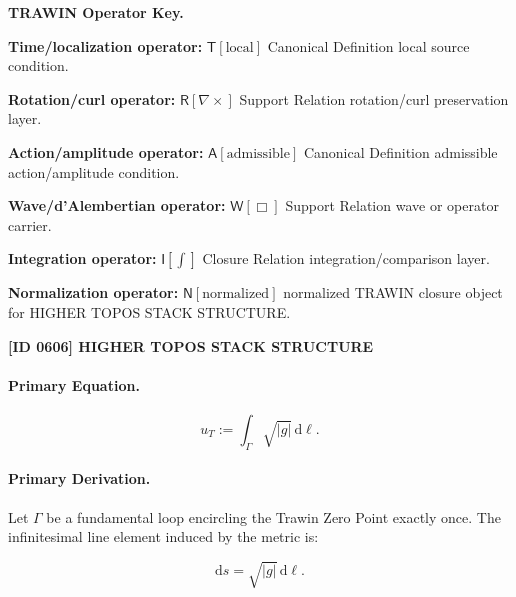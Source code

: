 \par\vspace{0.45\baselineskip}
\noindent\begin{minipage}[t]{\linewidth}
\begingroup
\small
\raggedright
\textbf{TRAWIN Operator Key.}\par
\noindent\textbf{Time/localization operator:} $\mathsf{T}\!\left[\mathrm{local}\right]$ Canonical Definition local source condition.\par
\noindent\textbf{Rotation/curl operator:} $\mathsf{R}\!\left[\nabla\times\right]$ Support Relation rotation/curl preservation layer.\par
\noindent\textbf{Action/amplitude operator:} $\mathsf{A}\!\left[\mathrm{admissible}\right]$ Canonical Definition admissible action/amplitude condition.\par
\noindent\textbf{Wave/d'Alembertian operator:} $\mathsf{W}\!\left[\Box\right]$ Support Relation wave or operator carrier.\par
\noindent\textbf{Integration operator:} $\mathsf{I}\!\left[\int\right]$ Closure Relation integration/comparison layer.\par
\noindent\textbf{Normalization operator:} $\mathsf{N}\!\left[\mathrm{normalized}\right]$ normalized TRAWIN closure object for HIGHER TOPOS STACK STRUCTURE.\par
\endgroup
\end{minipage}

\clearpage
\noindent\textbf{[ID 0606] HIGHER TOPOS STACK STRUCTURE}\par
\vspace{0.35em}
\paragraph{Primary Equation.}
\begin{equation}
u_T := \int_{\Gamma}\sqrt{|g|}\,\mathrm{d}\ell .
\end{equation}

\paragraph{Primary Derivation.}
Let $\Gamma$ be a fundamental loop encircling the Trawin Zero Point exactly once.  
The infinitesimal line element induced by the metric is:

\begin{equation}
\mathrm{d}s = \sqrt{|g|}\,\mathrm{d}\ell .
\end{equation}

